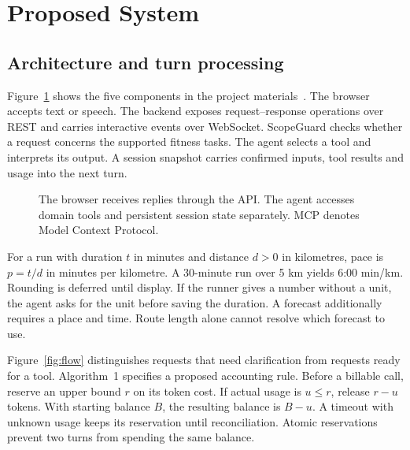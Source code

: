 \documentclass[conference]{IEEEtran}
\begin{document}
\section{Proposed System}
\subsection{Architecture and turn processing}
Figure~\ref{fig:arch} shows the five components in the project materials~\cite{project}. The browser accepts text or speech. The backend exposes request--response operations over REST and carries interactive events over WebSocket. ScopeGuard checks whether a request concerns the supported fitness tasks. The agent selects a tool and interprets its output. A session snapshot carries confirmed inputs, tool results and usage into the next turn.

\begin{figure}[htbp]\centering
{}
\caption{The browser receives replies through the API. The agent accesses domain tools and persistent session state separately. MCP denotes Model Context Protocol.}\label{fig:arch}
\end{figure}

For a run with duration $t$ in minutes and distance $d>0$ in kilometres, pace is $p=t/d$ in minutes per kilometre. A 30-minute run over 5 km yields 6:00 min/km. Rounding is deferred until display. If the runner gives a number without a unit, the agent asks for the unit before saving the duration. A forecast additionally requires a place and time. Route length alone cannot resolve which forecast to use.

Figure~\ref{fig:flow} distinguishes requests that need clarification from requests ready for a tool. Algorithm~1 specifies a proposed accounting rule. Before a billable call, reserve an upper bound $r$ on its token cost. If actual usage is $u\leq r$, release $r-u$ tokens. With starting balance $B$, the resulting balance is $B-u$. A timeout with unknown usage keeps its reservation until reconciliation. Atomic reservations prevent two turns from spending the same balance.
\end{document}

